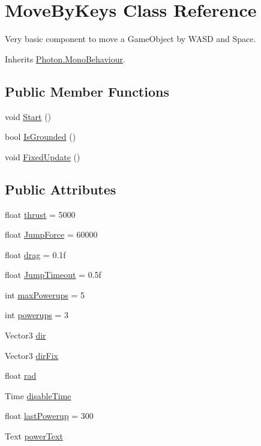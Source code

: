 \hypertarget{class_move_by_keys}{}\section{Move\+By\+Keys Class Reference}
\label{class_move_by_keys}


Very basic component to move a Game\+Object by W\+A\+SD and Space.  




Inherits \hyperlink{class_photon_1_1_mono_behaviour}{Photon.\+Mono\+Behaviour}.

\subsection*{Public Member Functions}
\begin{DoxyCompactItemize}
\item 
void \hyperlink{class_move_by_keys_a12c386cc63b886a811e2801c6631f7c6}{Start} ()
\item 
bool \hyperlink{class_move_by_keys_a12f570fff90c264f8ff855d82886d732}{Is\+Grounded} ()
\item 
void \hyperlink{class_move_by_keys_aeeea5b489d6daab0aa8e9fc1672f5310}{Fixed\+Update} ()
\end{DoxyCompactItemize}
\subsection*{Public Attributes}
\begin{DoxyCompactItemize}
\item 
float \hyperlink{class_move_by_keys_a5702f7b18a522ed877f1c1683e3acd6e}{thrust} = 5000
\item 
float \hyperlink{class_move_by_keys_a88d3e6e148a44325eb48ec6cc3fd0f03}{Jump\+Force} = 60000
\item 
float \hyperlink{class_move_by_keys_a5edbdd945711dcfbe8bb4f167ba58792}{drag} = 0.\+1f
\item 
float \hyperlink{class_move_by_keys_a78f351dfc4cfdf17213df54dee9ba73f}{Jump\+Timeout} = 0.\+5f
\item 
int \hyperlink{class_move_by_keys_a9b7af28eaf4c23171369032a0dd171e7}{max\+Powerups} = 5
\item 
int \hyperlink{class_move_by_keys_aeecad27d187dfaed51bf2066fb1fab68}{powerups} = 3
\item 
Vector3 \hyperlink{class_move_by_keys_a06a0f4cd939aba5cf42ad4aa1626ec55}{dir}
\item 
Vector3 \hyperlink{class_move_by_keys_abf85f85c6014dd249ceb5d5d6bd54353}{dir\+Fix}
\item 
float \hyperlink{class_move_by_keys_ab257d4fc7ebb9aa457bb19c85dc7874d}{rad}
\item 
Time \hyperlink{class_move_by_keys_abc8e3273ebda7bbcfb644708d97d00af}{disable\+Time}
\item 
float \hyperlink{class_move_by_keys_a02e29cd5cceb6abcd76a4b727cff4ffd}{last\+Powerup} = 300
\item 
Text \hyperlink{class_move_by_keys_a6efe1cee861dfc29de98c04fe047a3c0}{power\+Text}
\end{DoxyCompactItemize}
